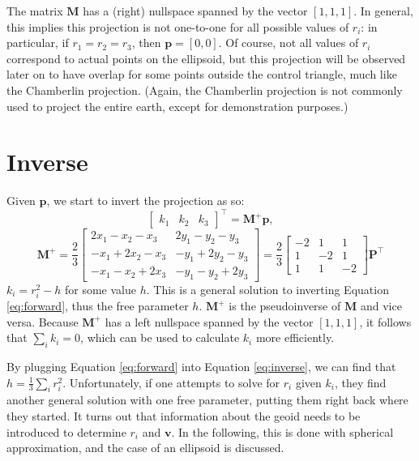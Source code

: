 \documentclass{amsart}[12pt]
\begin{document}
The matrix $\mathbf M$ has a (right) nullspace spanned by the vector $[1,1,1]$.
In general, this implies this projection is not one-to-one for all possible
values of $r_i$: in particular, if $r_1 = r_2 = r_3$, then $\mathbf p = [0,0]$.
Of course, not all values of $r_i$ correspond to actual points on the ellipsoid,
but this projection will be observed later on to have overlap for some points
outside the control triangle, much like the Chamberlin projection.
(Again, the Chamberlin projection is not commonly used to project the entire
earth, except for demonstration purposes.)

\section{Inverse}
Given $\mathbf p$, we start to invert the projection as so:
\begin{equation}\label{eq:inverse}
\begin{bmatrix} k_1 & k_2 & k_3

\end{bmatrix}^\top = \mathbf M^+ \mathbf p,
\end{equation}
\begin{equation}
\mathbf M^+ = \frac{2}{3}
\begin{bmatrix} 2x_1 - x_2 - x_3 & 2y_1 - y_2 - y_3 \\
-x_1 + 2x_2 - x_3 & -y_1 + 2y_2 - y_3 \\
-x_1 - x_2 + 2x_3 & -y_1 - y_2 + 2y_3
\end{bmatrix} = \frac{2}{3}
\begin{bmatrix} -2 & 1 & 1 \\
1 & -2 & 1 \\
1 & 1 & -2
\end{bmatrix}
\mathbf P^\top
\end{equation}
$k_i = r^2_i - h$ for some value $h$. This is a general solution to inverting
Equation \ref{eq:forward}, thus the free parameter $h$. $\mathbf M^+$ is the
pseudoinverse of $\mathbf M$ and vice versa. Because $\mathbf M^+$ has a left
nullspace spanned by the vector $[1,1,1]$, it follows that $\sum_i k_i = 0$,
which can be used to calculate $k_i$ more efficiently.

By plugging Equation \ref{eq:forward} into Equation \ref{eq:inverse}, we can
find that $h = \frac{1}{3}\sum_i r^2_i$. Unfortunately, if one attempts to
solve for $r_i$ given $k_i$, they find another general solution with one free
parameter, putting them right back where they started. It turns out that
information about the geoid needs to be introduced to determine $r_i$ and
$\mathbf v$. In the following, this is done with spherical approximation, and
the case of an ellipsoid is discussed.
\end{document}

